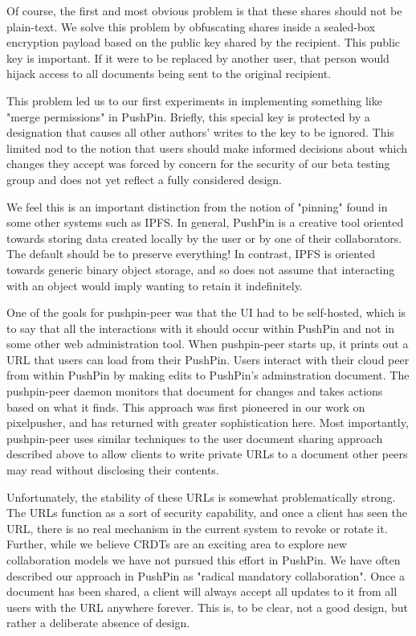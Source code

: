 Of course, the first and most obvious problem is that these shares should not be plain-text. We solve this problem by obfuscating shares inside a sealed-box encryption payload based on the public key shared by the recipient. This public key is important. If it were to be replaced by another user, that person would hijack access to all documents being sent to the original recipient.

This problem led us to our first experiments in implementing something like "merge permissions" in PushPin. Briefly, this special key is protected by a designation that causes all other authors' writes to the key to be ignored. This limited nod to the notion that users should make informed decisions about which changes they accept was forced by concern for the security of our beta testing group and does not yet reflect a fully considered design.


We feel this is an important distinction from the notion of "pinning" found in some other systems such as IPFS. In general, PushPin is a creative tool oriented towards storing data created locally by the user or by one of their collaborators. The default should be to preserve everything! In contrast, IPFS is oriented towards generic binary object storage, and so does not assume that interacting with an object would imply wanting to retain it indefinitely.

One of the goals for pushpin-peer was that the UI had to be self-hosted, which is to say that all the interactions with it should occur within PushPin and not in some other web administration tool. When pushpin-peer starts up, it prints out a URL that users can load from their PushPin. Users interact with their cloud peer from within PushPin by making edits to PushPin's adminstration document. The pushpin-peer daemon monitors that document for changes and takes actions based on what it finds. This approach was first pioneered in our work on pixelpusher, and has returned with greater sophistication here. Most importantly, pushpin-peer uses similar techniques to the user document sharing approach described above to allow clients to write private URLs to a document other peers may read without disclosing their contents.


Unfortunately, the stability of these URLs is somewhat problematically strong. The URLs function as a sort of security capability, and once a client has seen the URL, there is no real mechanism in the current system to revoke or rotate it. Further, while we believe CRDTs are an exciting area to explore new collaboration models \cite{Pixelpusher} we have not pursued this effort in PushPin. We have often described our approach in PushPin as "radical mandatory collaboration". Once a document has been shared, a client will always accept all updates to it from all users with the URL anywhere forever. This is, to be clear, not a good design, but rather a deliberate absence of design. 

